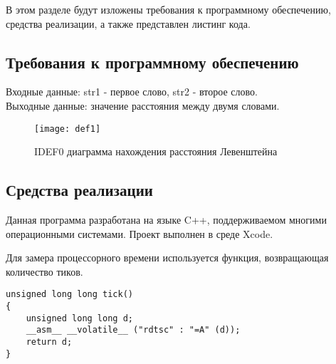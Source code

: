 \documentclass[a4paper, 14pt]{article}
\begin{document}
	В этом разделе будут изложены требования к программному обеспечению, средства реализации, а также представлен листинг кода.
	
	\subsection{Требования к программному обеспечению}
	
	Входные данные: str1 - первое слово, str2 - второе слово.\\
	Выходные данные: значение расстояния между двумя словами.

	\begin{figure}[H]
        	\begin{center}
        		{\texttt{[image: def1]}}
        		\caption{IDEF0 диаграмма нахождения расстояния Левенштейна}
        	\end{center}
        \end{figure}
	
	\subsection{Средства реализации}
	
	Данная программа разработана на языке C++, поддерживаемом многими операционными системами. Проект выполнен в среде Xcode. 
	
	Для замера процессорного времени используется функция, возвращающая количество тиков.
	
	\begin{lstlisting}[label=some-code,caption=Функция замера количества тиков]
unsigned long long tick()
{
    unsigned long long d;
    __asm__ __volatile__ ("rdtsc" : "=A" (d));
    return d;
}
\end{lstlisting}

\newpage
\end{document}
